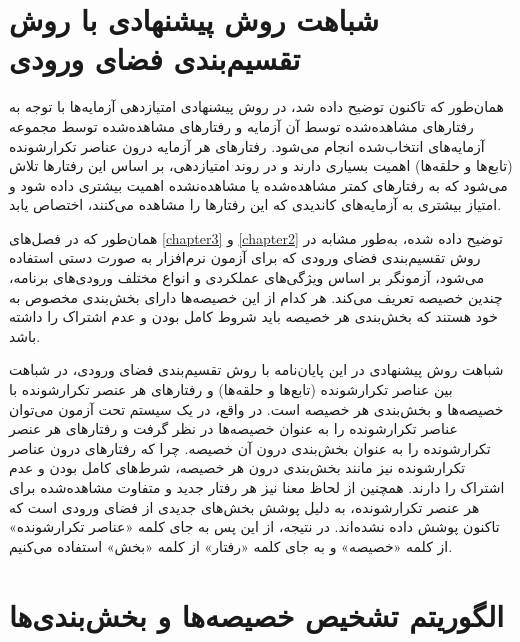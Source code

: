 \section{شباهت روش پیشنهادی با روش تقسیم‌بندی فضای ورودی}

همان‌طور که تاکنون توضیح داده شد، در روش پیشنهادی امتیازدهی آزمایه‌ها با توجه به رفتارهای مشاهده‌شده توسط آن آزمایه و رفتارهای مشاهده‌شده توسط مجموعه آزمایه‌های انتخاب‌شده انجام می‌شود. رفتارهای هر آزمایه درون عناصر تکرارشونده (تابع‌ها و حلقه‌ها) اهمیت بسیاری دارند و در روند امتیازدهی، بر اساس این رفتارها تلاش می‌شود که به رفتارهای کمتر مشاهده‌شده یا مشاهده‌نشده اهمیت بیشتری داده شود و امتیاز بیشتری به آزمایه‌های کاندیدی که این رفتارها را مشاهده می‌کنند، اختصاص یابد.

همان‌طور که در فصل‌های \ref{chapter3} و \ref{chapter2} توضیح داده شده، به‌طور مشابه در روش تقسیم‌بندی فضای ورودی که برای آزمون نرم‌افزار به صورت دستی استفاده می‌شود، آزمونگر بر اساس ویژگی‌های عملکردی و انواع مختلف ورودی‌های برنامه، چندین خصیصه تعریف می‌کند. هر کدام از این خصیصه‌ها دارای بخش‌بندی مخصوص به خود هستند که بخش‌بندی هر خصیصه باید شروط کامل بودن و عدم اشتراک را داشته باشد.

شباهت روش پیشنهادی در این پایان‌نامه با روش تقسیم‌بندی فضای ورودی، در شباهت بین عناصر تکرارشونده (تابع‌ها و حلقه‌ها) و رفتارهای هر عنصر تکرارشونده با خصیصه‌ها و بخش‌بندی هر خصیصه است. در واقع، در یک سیستم تحت آزمون می‌توان عناصر تکرارشونده را به عنوان خصیصه‌ها در نظر گرفت و رفتارهای هر عنصر تکرارشونده را به عنوان بخش‌بندی درون آن خصیصه. چرا که رفتارهای درون عناصر تکرارشونده نیز مانند بخش‌بندی درون هر خصیصه، شرط‌های کامل بودن و عدم اشتراک را دارند. همچنین از لحاظ معنا نیز هر رفتار جدید و متفاوت مشاهده‌شده برای هر عنصر تکرارشونده، به دلیل پوشش بخش‌های جدیدی از فضای ورودی است که تاکنون پوشش داده نشده‌اند. در نتیجه،‌ از این پس به جای کلمه «عناصر تکرارشونده» از کلمه «خصیصه» و به جای کلمه «رفتار» از کلمه «بخش‌‌» استفاده می‌کنیم.


\section{الگوریتم تشخیص خصیصه‌ها و بخش‌بندی‌ها}


